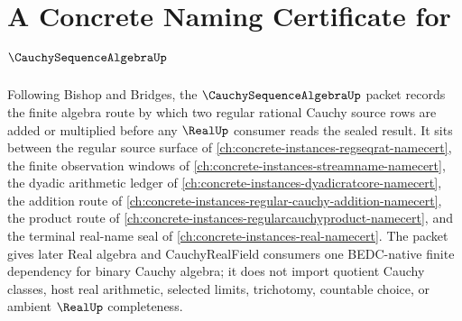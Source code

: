 \chapter{A Concrete Naming Certificate for $\CauchySequenceAlgebraUp$}
\label{ch:concrete-instances-cauchy-sequence-algebra-namecert}

Following Bishop and Bridges, the $\CauchySequenceAlgebraUp$ packet records the finite algebra route by which two regular rational Cauchy source rows are added or multiplied before any $\RealUp$ consumer reads the sealed result. It sits between the regular source surface of \autoref{ch:concrete-instances-regseqrat-namecert}, the finite observation windows of \autoref{ch:concrete-instances-streamname-namecert}, the dyadic arithmetic ledger of \autoref{ch:concrete-instances-dyadicratcore-namecert}, the addition route of \autoref{ch:concrete-instances-regular-cauchy-addition-namecert}, the product route of \autoref{ch:concrete-instances-regularcauchyproduct-namecert}, and the terminal real-name seal of \autoref{ch:concrete-instances-real-namecert}. The packet gives later Real algebra and CauchyRealField consumers one BEDC-native finite dependency for binary Cauchy algebra; it does not import quotient Cauchy classes, host real arithmetic, selected limits, trichotomy, countable choice, or ambient $\RealUp$ completeness.


